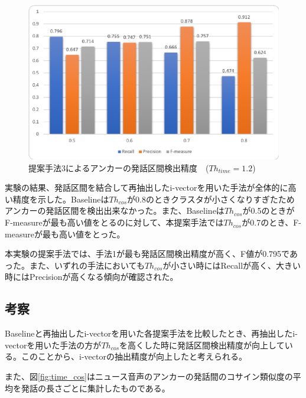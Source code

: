 \begin{figure}[H]
  \begin{center}
    \includegraphics[scale=0.8]{./figure/get_anchor_prob3.eps}
  \end{center}
  \caption{提案手法3によるアンカーの発話区間検出精度　($Th_{time}=1.2$) \label{fig:result_anchor_prob3}}
\end{figure}

実験の結果、発話区間を結合して再抽出したi-vectorを用いた手法が全体的に高い精度を示した。Baselineは$Th_{cos}$が0.8のときクラスタが小さくなりすぎたためアンカーの発話区間を検出出来なかった。また、Baselineは$Th_{cos}$が0.5のときがF-measureが最も高い値をとるのに対して、本提案手法では$Th_{cos}$が0.7のとき、F-measureが最も高い値をとった。\par
本実験の提案手法では、手法1が最も発話区間検出精度が高く、F値が0.795であった。また、いずれの手法においても$Th_{cos}$が小さい時にはRecallが高く、大きい時にはPrecisionが高くなる傾向が確認された。

\subsection{考察}
Baselineと再抽出したi-vectorを用いた各提案手法を比較したとき、再抽出したi-vectorを用いた手法の方が$Th_{cos}$を高くした時に発話区間検出精度が向上している。このことから、i-vectorの抽出精度が向上したと考えられる。\par
また、図\ref{fig:time_cos}はニュース音声のアンカーの発話間のコサイン類似度の平均を発話の長さごとに集計したものである。

